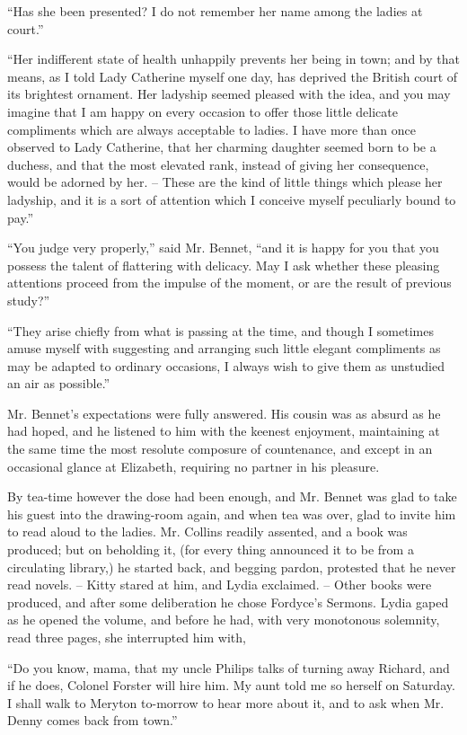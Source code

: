 “Has she been presented? I do not remember her
name among the ladies at court.”

“Her indifferent state of health unhappily prevents
her being in town; and by that means, as I told Lady
Catherine myself one day, has deprived the British court
of its brightest ornament. Her ladyship seemed pleased
with the idea, and you may imagine that I am happy
on every occasion to offer those little delicate compliments
which are always acceptable to ladies. I have
more than once observed to Lady Catherine, that her
charming daughter seemed born to be a duchess, and that
the most elevated rank, instead of giving her consequence,
would be adorned by her. -- These are the kind of little
things which please her ladyship, and it is a sort of
attention which I conceive myself peculiarly bound to
pay.”

“You judge very properly,” said Mr. Bennet, “and it
is happy for you that you possess the talent of flattering
with delicacy. May I ask whether these pleasing attentions
proceed from the impulse of the moment, or are the
result of previous study?”

“They arise chiefly from what is passing at the time,
and though I sometimes amuse myself with suggesting
and arranging such little elegant compliments as may be
adapted to ordinary occasions, I always wish to give them
as unstudied an air as possible.”

Mr. Bennet’s expectations were fully answered. His
cousin was as absurd as he had hoped, and he listened
to him with the keenest enjoyment, maintaining at the
same time the most resolute composure of countenance,
and except in an occasional glance at Elizabeth, requiring
no partner in his pleasure.

By tea-time however the dose had been enough, and
Mr. Bennet was glad to take his guest into the drawing-room
again, and when tea was over, glad to invite him
to read aloud to the ladies. Mr. Collins readily assented,
and a book was produced; but on beholding it, (for
every thing announced it to be from a circulating library,)
he started back, and begging pardon, protested that he
never read novels. -- Kitty stared at him, and Lydia
exclaimed. -- Other books were produced, and after some
deliberation he chose Fordyce’s Sermons. Lydia gaped
as he opened the volume, and before he had, with very
monotonous solemnity, read three pages, she interrupted
him with,

“Do you know, mama, that my uncle Philips talks
of turning away Richard, and if he does, Colonel Forster
will hire him. My aunt told me so herself on Saturday.
I shall walk to Meryton to-morrow to hear more about
it, and to ask when Mr. Denny comes back from
town.”

